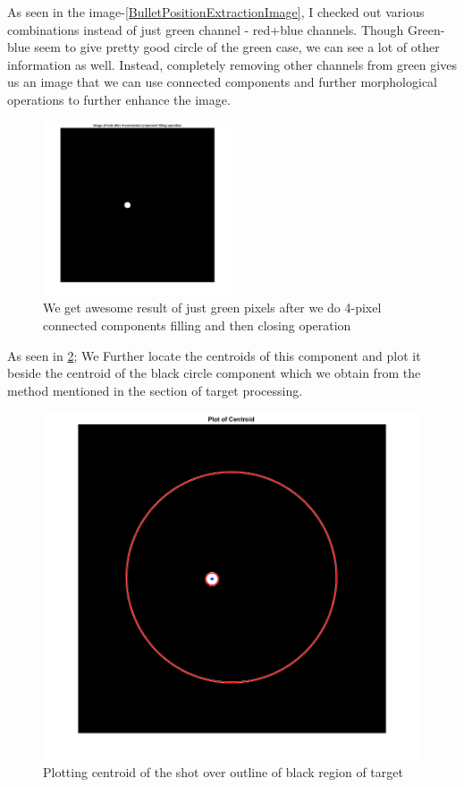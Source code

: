 \documentclass[10pt,twocolumn,letterpaper]{article}
\begin{document}
As seen in the image-\ref{BulletPositionExtractionImage}, I checked out various combinations instead of just green channel - red+blue channels. Though Green-blue seem to give pretty good circle of the green case, we can see a lot of other information as well. Instead, completely removing other channels from green gives us an image that we can use connected components and further morphological operations to further enhance the image.
\begin{figure}[h]
	\centering
	\includegraphics[width=0.5\textwidth]{OnlyGreenAfterRefine}
	\caption{We get awesome result of just green pixels after we do 4-pixel connected components filling and then closing operation}
	\label{OnlyGreenAfterRefine}
\end{figure}
As seen in \ref{ShotCentroid}; We Further locate the centroids of this component and plot it beside the centroid of the black circle component which we obtain from the method mentioned in the section of target processing.
\begin{figure} 
	\centering
	\includegraphics[width=\linewidth]{ShotCentroid}
	\caption{Plotting centroid of the shot over outline of black region of target}
	\label{ShotCentroid}
\end{figure}
\end{document}
